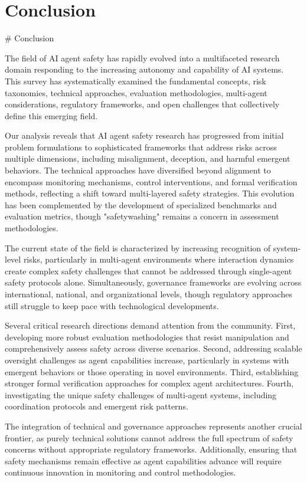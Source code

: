 \documentclass[conference]{IEEEtran}
\begin{document}
\section{Conclusion}

# Conclusion

The field of AI agent safety has rapidly evolved into a multifaceted research domain responding to the increasing autonomy and capability of AI systems. This survey has systematically examined the fundamental concepts, risk taxonomies, technical approaches, evaluation methodologies, multi-agent considerations, regulatory frameworks, and open challenges that collectively define this emerging field.

Our analysis reveals that AI agent safety research has progressed from initial problem formulations to sophisticated frameworks that address risks across multiple dimensions, including misalignment, deception, and harmful emergent behaviors. The technical approaches have diversified beyond alignment to encompass monitoring mechanisms, control interventions, and formal verification methods, reflecting a shift toward multi-layered safety strategies. This evolution has been complemented by the development of specialized benchmarks and evaluation metrics, though "safetywashing" remains a concern in assessment methodologies.

The current state of the field is characterized by increasing recognition of system-level risks, particularly in multi-agent environments where interaction dynamics create complex safety challenges that cannot be addressed through single-agent safety protocols alone. Simultaneously, governance frameworks are evolving across international, national, and organizational levels, though regulatory approaches still struggle to keep pace with technological developments.

Several critical research directions demand attention from the community. First, developing more robust evaluation methodologies that resist manipulation and comprehensively assess safety across diverse scenarios. Second, addressing scalable oversight challenges as agent capabilities increase, particularly in systems with emergent behaviors or those operating in novel environments. Third, establishing stronger formal verification approaches for complex agent architectures. Fourth, investigating the unique safety challenges of multi-agent systems, including coordination protocols and emergent risk patterns.

The integration of technical and governance approaches represents another crucial frontier, as purely technical solutions cannot address the full spectrum of safety concerns without appropriate regulatory frameworks. Additionally, ensuring that safety mechanisms remain effective as agent capabilities advance will require continuous innovation in monitoring and control methodologies.
\end{document}
